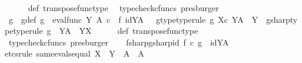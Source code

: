 \begin{isabellebody}
\ \ \ \ \isamarkupfalse%
\ {\isasympsi}{\isacharunderscore}{\kern0pt}def\ transpose{\isacharunderscore}{\kern0pt}func{\isacharunderscore}{\kern0pt}type\ \isamarkupfalse%
\ {\isacharparenleft}{\kern0pt}typecheck{\isacharunderscore}{\kern0pt}cfuncs{\isacharcomma}{\kern0pt}\ presburger{\isacharparenright}{\kern0pt}\isanewline
\ \ \isamarkupfalse%
\ g\ \ g{\isacharunderscore}{\kern0pt}def{\isacharcolon}{\kern0pt}\ {\isachardoublequoteopen}g\ {\isacharequal}{\kern0pt}\ {\isacharparenleft}{\kern0pt}eval{\isacharunderscore}{\kern0pt}func\ Y\ A{\isacharparenright}{\kern0pt}\ {\isasymcirc}\isactrlsub c\ {\isacharparenleft}{\kern0pt}{\isasymphi}\ {\isasymtimes}\isactrlsub f\ id{\isacharparenleft}{\kern0pt}Y\isactrlbsup A\isactrlesup {\isacharparenright}{\kern0pt}{\isacharparenright}{\kern0pt}{\isachardoublequoteclose}\ \ \ g{\isacharunderscore}{\kern0pt}type{\isacharbrackleft}{\kern0pt}type{\isacharunderscore}{\kern0pt}rule{\isacharbrackright}{\kern0pt}{\isacharcolon}{\kern0pt}\ {\isachardoublequoteopen}g{\isacharcolon}{\kern0pt}\ X{\isasymtimes}\isactrlsub c\ {\isacharparenleft}{\kern0pt}Y\isactrlbsup A\isactrlesup {\isacharparenright}{\kern0pt}\ {\isasymrightarrow}\ Y{\isachardoublequoteclose}\ \ gsharp{\isacharunderscore}{\kern0pt}type{\isacharbrackleft}{\kern0pt}type{\isacharunderscore}{\kern0pt}rule{\isacharbrackright}{\kern0pt}{\isacharcolon}{\kern0pt}\ {\isachardoublequoteopen}g\isactrlsup {\isasymsharp}\ {\isacharcolon}{\kern0pt}\ Y\isactrlbsup A\isactrlesup \ {\isasymrightarrow}\ Y\isactrlbsup X\isactrlesup {\isachardoublequoteclose}\isanewline
\ \ \ \ \isamarkupfalse%
\ {\isasymphi}{\isacharunderscore}{\kern0pt}def\ transpose{\isacharunderscore}{\kern0pt}func{\isacharunderscore}{\kern0pt}type\ \isamarkupfalse%
\ {\isacharparenleft}{\kern0pt}typecheck{\isacharunderscore}{\kern0pt}cfuncs{\isacharcomma}{\kern0pt}\ presburger{\isacharparenright}{\kern0pt}\isanewline
\isanewline
\ \ \isamarkupfalse%
\ fsharp{\isacharunderscore}{\kern0pt}gsharp{\isacharunderscore}{\kern0pt}id{\isacharcolon}{\kern0pt}\ {\isachardoublequoteopen}f\isactrlsup {\isasymsharp}\ {\isasymcirc}\isactrlsub c\ g\isactrlsup {\isasymsharp}\ {\isacharequal}{\kern0pt}\ id{\isacharparenleft}{\kern0pt}Y\isactrlbsup A\isactrlesup {\isacharparenright}{\kern0pt}{\isachardoublequoteclose}\isanewline
\ \ \isamarkupfalse%
{\isacharparenleft}{\kern0pt}etcs{\isacharunderscore}{\kern0pt}rule\ same{\isacharunderscore}{\kern0pt}evals{\isacharunderscore}{\kern0pt}equal{\isacharbrackleft}{\kern0pt}\ X\ {\isacharequal}{\kern0pt}\ Y{\isacharcomma}{\kern0pt}\ \ A\ {\isacharequal}{\kern0pt}\ A{\isacharbrackright}{\kern0pt}{\isacharparenright}{\kern0pt}\isanewline

\end{isabellebody}
